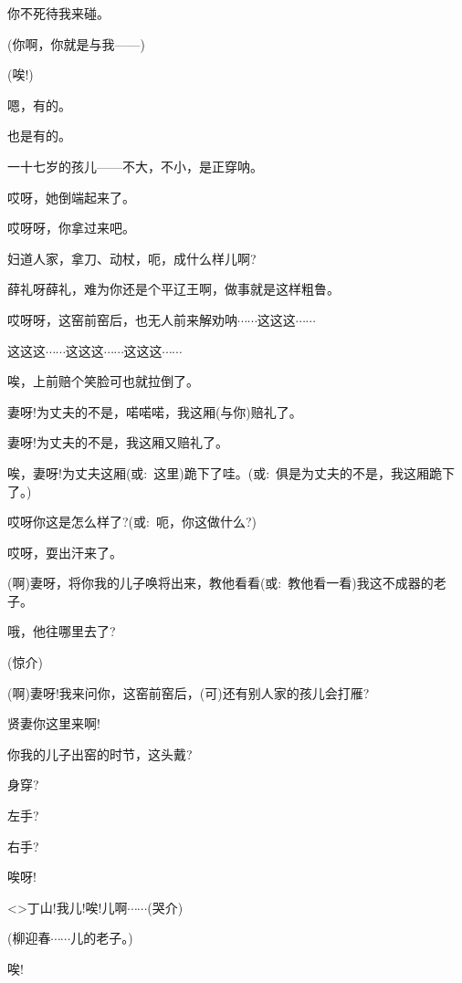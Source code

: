 {{你不死待我来碰。

(你啊，你就是与我------)

(唉!)

嗯，有的。

也是有的。

一十七岁的孩儿------不大，不小，是正穿呐。

哎呀，她倒端起来了。

哎呀呀，你拿过来吧。

妇道人家，拿刀、动杖，呃，成什么样儿啊?

薛礼呀薛礼，难为你还是个平辽王啊，做事就是这样粗鲁。

哎呀呀，这窑前窑后，也无人前来解劝呐$\cdots{}\cdots{}$这这这$\cdots{}\cdots{}$

这这这$\cdots{}\cdots{}$这这这$\cdots{}\cdots{}$这这这$\cdots{}\cdots{}$

唉，上前赔个笑脸可也就拉倒了。

妻呀!为丈夫的不是，喏喏喏，我这厢(与你)赔礼了。

妻呀!为丈夫的不是，我这厢又赔礼了。

唉，妻呀!为丈夫这厢({\akai 或}:~这里)跪下了哇。({\akai 或}:~俱是为丈夫的不是，我这厢跪下了。)

哎呀你这是怎么样了?({\akai 或}:~呃，你这做什么?)

哎呀，耍出汗来了。

(啊)妻呀，将你我的儿子唤将出来，教他看看({\akai 或}:~教他看一看)我这不成器的老子。

哦，他往哪里去了?

(惊{\hwfs 介})

(啊)妻呀!我来问你，这窑前窑后，(可)还有别人家的孩儿会打雁?

贤妻你这里来啊!

你我的儿子出窑的时节，这头戴?

身穿?

左手?

右手?

唉呀!


\textless{}\!\textgreater{}丁山!我儿!唉!儿啊$\cdots{}\cdots{}$({\hwfs 哭介})

(柳迎春\hspace{20pt}$\cdots{}\cdots{}$儿的老子。)

唉!


}}
